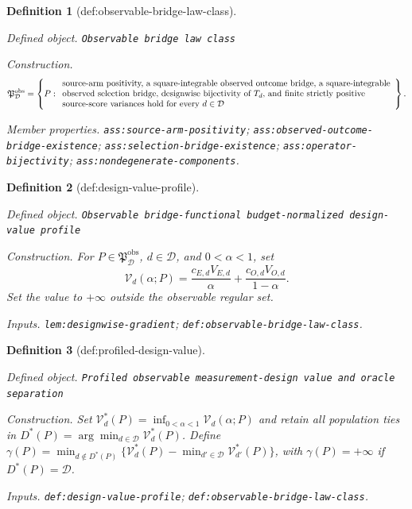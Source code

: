 \documentclass{article}
\newtheorem{definition}{Definition}
\begin{document}
\begin{definition}[def:observable-bridge-law-class]\label{def:observable-bridge-law-class}
\par\smallskip\noindent\emph{Defined object.} \texttt{Observable bridge law class}
\par\smallskip\noindent\emph{Construction.} \[
\mathfrak P_{\mathcal D}^{\mathrm{obs}}
=\left\{P:\begin{array}{l}
\text{source-arm positivity, a square-integrable observed outcome bridge, a square-integrable}\cr
\text{observed selection bridge, designwise bijectivity of \(T_d\), and finite strictly positive}\cr
\text{source-score variances hold for every \(d\in\mathcal D\)}
\end{array}\right\}.
\]
\par\smallskip\noindent\emph{Member properties.} \texttt{ass:\allowbreak{}source-\allowbreak{}arm-\allowbreak{}positivity}; \texttt{ass:\allowbreak{}observed-\allowbreak{}outcome-\allowbreak{}bridge-\allowbreak{}existence}; \texttt{ass:\allowbreak{}selection-\allowbreak{}bridge-\allowbreak{}existence}; \texttt{ass:\allowbreak{}operator-\allowbreak{}bijectivity}; \texttt{ass:\allowbreak{}nondegenerate-\allowbreak{}components}.
\end{definition}

\begin{definition}[def:design-value-profile]\label{def:design-value-profile}
\par\smallskip\noindent\emph{Defined object.} \texttt{Observable bridge-\allowbreak{}functional budget-\allowbreak{}normalized design-\allowbreak{}value profile}
\par\smallskip\noindent\emph{Construction.} For \(P\in\mathfrak P_{\mathcal D}^{\mathrm{obs}}\), \(d\in\mathcal D\), and \(0<\alpha<1\), set
\[
\mathcal V_d(\alpha;P)=\frac{c_{E,d}V_{E,d}}{\alpha}+\frac{c_{O,d}V_{O,d}}{1-\alpha}.
\]
Set the value to \(+\infty\) outside the observable regular set.
\par\smallskip\noindent\emph{Inputs.} \texttt{lem:\allowbreak{}designwise-\allowbreak{}gradient}; \texttt{def:\allowbreak{}observable-\allowbreak{}bridge-\allowbreak{}law-\allowbreak{}class}.
\end{definition}

\begin{definition}[def:profiled-design-value]\label{def:profiled-design-value}
\par\smallskip\noindent\emph{Defined object.} \texttt{Profiled observable measurement-\allowbreak{}design value and oracle separation}
\par\smallskip\noindent\emph{Construction.} Set \(\mathcal V_d^*(P)=\inf_{0<\alpha<1}\mathcal V_d(\alpha;P)\) and retain all population ties in \(D^*(P)=\arg\min_{d\in\mathcal D}\mathcal V_d^*(P)\). Define \(\gamma(P)=\min_{d\notin D^*(P)}\{\mathcal V_d^*(P)-\min_{d'\in\mathcal D}\mathcal V_{d'}^*(P)\}\), with \(\gamma(P)=+\infty\) if \(D^*(P)=\mathcal D\).
\par\smallskip\noindent\emph{Inputs.} \texttt{def:\allowbreak{}design-\allowbreak{}value-\allowbreak{}profile}; \texttt{def:\allowbreak{}observable-\allowbreak{}bridge-\allowbreak{}law-\allowbreak{}class}.
\end{definition}
\end{document}
